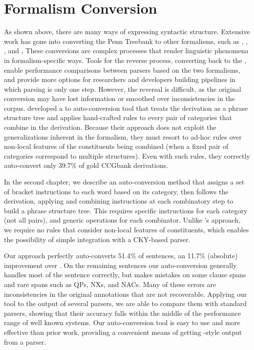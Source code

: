\section{Formalism Conversion}

As shown above, there are many ways of expressing syntactic structure.
Extensive work has gone into converting the Penn Treebank to other formalisms, such as \hpsg \parencite{Miyao-Ninomiya-Tsujii:2004}, \lfg \parencite{Cahill-etal:2008}, \ltag \parencite{Xia:1999}, and \ccg \parencite{CCGBank},
These conversions are complex processes that render linguistic phenomena in formalism-specific ways.
Tools for the reverse process, converting back to the \ptb, enable performance comparisons between parsers based on the two formalisms, and provide more options for researchers and developers building pipelines in which parsing is only one step.
However, the reversal is difficult, as the original conversion may have lost information or smoothed over inconsistencies in the corpus.
\textcite{Clark-Curran:2009} developed a \ccg to \ptb auto-conversion tool that treats the \ccg derivation as a phrase structure tree and applies hand-crafted rules to every pair of categories that combine in the derivation.
Because their approach does not exploit the generalizations inherent in the \ccg formalism, they must resort to ad-hoc rules over non-local features of the \ccg constituents being combined (when a fixed pair of \ccg categories correspond to multiple \ptb structures).
Even with such rules, they correctly auto-convert only 39.7\% of gold CCGbank derivations.

In the second chapter, we describe an auto-conversion method that assigns a set of bracket instructions to each word based on its \ccg category, then follows the \ccg derivation, applying and combining instructions at each combinatory step to build a phrase structure tree.
This requires specific instructions for each category (not all pairs), and generic operations for each combinator.
Unlike \textcite{Clark-Curran:2009}'s approach, we require no rules that consider non-local features of constituents, which enables the possibility of simple integration with a CKY-based parser.

Our approach perfectly auto-converts 51.4\% of sentences, an 11.7\% (absolute) improvement over \textcite{Clark-Curran:2009}.
On the remaining sentences our auto-conversion generally handles most of the sentence correctly, but makes mistakes on some clause spans and rare spans such as QPs, NXs, and NACs.
Many of these errors are inconsistencies in the original \ptb annotations that are not recoverable.
Applying our tool to the output of several \ccg parsers, we are able to compare them with standard \ptb parsers, showing that their accuracy falls within the middle of the performance range of well known systems.
Our auto-conversion tool is easy to use and more effective than prior work, providing a convenient means of getting \ptb-style output from a \ccg parser.


